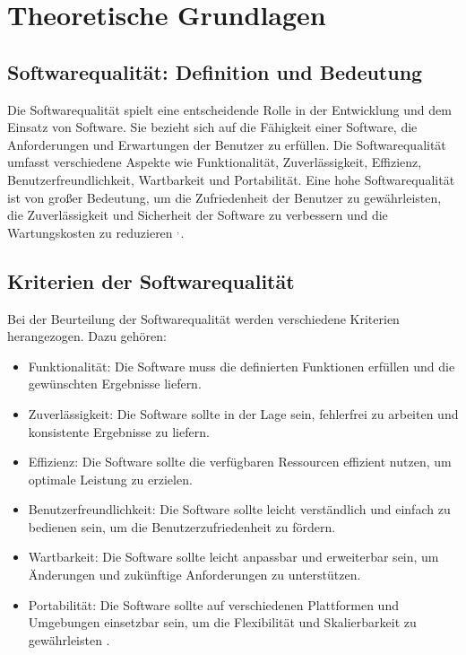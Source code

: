\section{Theoretische Grundlagen}

\subsection{Softwarequalität: Definition und Bedeutung}
Die Softwarequalität spielt eine entscheidende Rolle in der Entwicklung und dem Einsatz von Software. Sie bezieht sich auf die Fähigkeit einer Software, die Anforderungen und Erwartungen der Benutzer zu erfüllen. Die Softwarequalität umfasst verschiedene Aspekte wie Funktionalität, Zuverlässigkeit, Effizienz, Benutzerfreundlichkeit, Wartbarkeit und Portabilität. Eine hohe Softwarequalität ist von großer Bedeutung, um die Zufriedenheit der Benutzer zu gewährleisten, die Zuverlässigkeit und Sicherheit der Software zu verbessern und die Wartungskosten zu reduzieren $^{,\hspace{1pt}}$.

\subsection{Kriterien der Softwarequalität}
Bei der Beurteilung der Softwarequalität werden verschiedene Kriterien herangezogen. Dazu gehören:

\begin{itemize}
\item Funktionalität: Die Software muss die definierten Funktionen erfüllen und die gewünschten Ergebnisse liefern.
\item Zuverlässigkeit: Die Software sollte in der Lage sein, fehlerfrei zu arbeiten und konsistente Ergebnisse zu liefern.
\item Effizienz: Die Software sollte die verfügbaren Ressourcen effizient nutzen, um optimale Leistung zu erzielen.
\item Benutzerfreundlichkeit: Die Software sollte leicht verständlich und einfach zu bedienen sein, um die Benutzerzufriedenheit zu fördern.
\item Wartbarkeit: Die Software sollte leicht anpassbar und erweiterbar sein, um Änderungen und zukünftige Anforderungen zu unterstützen.
\item Portabilität: Die Software sollte auf verschiedenen Plattformen und Umgebungen einsetzbar sein, um die Flexibilität und Skalierbarkeit zu gewährleisten .
\end{itemize}

